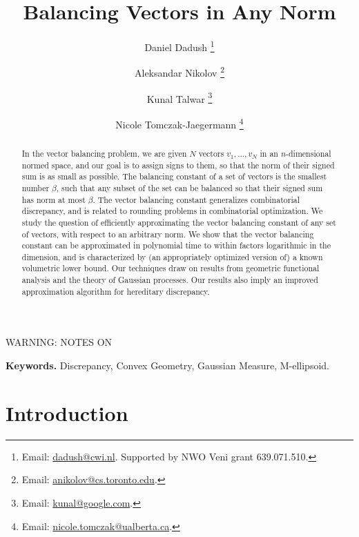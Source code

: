 \documentclass[11pt]{article}
\newcommand{\noteswarning}{{\begin{center} {\Large WARNING: NOTES ON}\end{center}}}
\newcommand{\noteswarning}{{}}
\begin{document}
\title{Balancing Vectors in Any Norm}
\author[1]{Daniel Dadush
\thanks{Email: \href{mailto:dadush@cwi.nl}{dadush@cwi.nl}.
Supported by NWO Veni grant 639.071.510.}} 
\author[2]{ 
Aleksandar Nikolov
\thanks{Email: \href{mailto:anikolov@cs.toronto.edu}{anikolov@cs.toronto.edu}.}}
\author[3]{
Kunal Talwar
\thanks{Email: \href{mailto:kunal@google.com}{kunal@google.com}.}} 
\author[4]{
Nicole Tomczak-Jaegermann
\thanks{Email: 
\href{mailto:nicole.tomczak@ualberta.ca}{nicole.tomczak@ualberta.ca}.}} 


\maketitle

\noteswarning

\begin{abstract}
In the vector balancing problem, we are given $N$ vectors $v_1,..., v_N$ in an
$n$-dimensional normed space, and our goal is to assign signs to them, so that
the norm of their signed sum is as small as possible. The balancing constant of
a set of vectors is the smallest number $\beta$, such that any subset of the set
can be balanced so that their signed sum has norm at most $\beta$. The vector
balancing constant generalizes combinatorial discrepancy, and is related to
rounding problems in combinatorial optimization. We study the question of
efficiently approximating the vector balancing constant of any set of vectors,
with respect to an arbitrary norm. We show that the vector balancing constant
can be approximated in polynomial time to within factors logarithmic in the
dimension, and is characterized by (an appropriately optimized version of) a
known volumetric lower bound. Our techniques draw on results from geometric
functional analysis and the theory of Gaussian processes.  Our results also
imply an improved approximation algorithm for hereditary discrepancy. 
\end{abstract}

\textbf{Keywords.}  Discrepancy, Convex Geometry, Gaussian Measure, M-ellipsoid.

\thispagestyle{empty}

\newpage

\setcounter{page}{1}

\section{Introduction}
\end{document}
